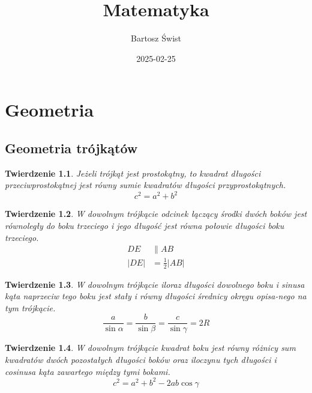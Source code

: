 \documentclass{report}
\title{Matematyka}
\date{2025-02-25}
\author{Bartosz Świst}
\newtheorem{theorem}{Twierdzenie}
\begin{document}
  \maketitle

  \chapter{Geometria}
    \section{Geometria trójkątów}
      \begin{theorem}
        Jeżeli trójkąt jest prostokątny, to kwadrat długości przeciwprostokątnej jest równy sumie kwadratów długości przyprostokątnych.
        \begin{equation}
          c^2 = a^2 + b^2
        \end{equation}
      \end{theorem}
      \begin{theorem}
        W dowolnym trójkącie odcinek łączący środki dwóch boków jest równoległy do boku trzeciego i jego długość jest równa połowie długości boku trzeciego.
        \begin{equation}
          \begin{aligned}
            DE &\parallel AB\\
            |DE| &= \frac 12|AB|
          \end{aligned}
        \end{equation}
      \end{theorem}
      \begin{theorem}
        W dowolnym trójkącie iloraz długości dowolnego boku i sinusa kąta naprzeciw tego boku jest stały i równy długości średnicy okręgu opisa-\-nego na tym trójkącie.
        \begin{equation}
          \frac{a}{\sin\alpha} = \frac{b}{\sin\beta} = \frac{c}{\sin\gamma} = 2R
        \end{equation}
      \end{theorem}
      \begin{theorem}
        W dowolnym trójkącie kwadrat boku jest równy różnicy sum kwadratów dwóch pozostałych długości boków oraz iloczynu tych długości i cosinusa kąta zawartego między tymi bokami.
        \begin{equation}
          c^2 = a^2 + b^2 - 2ab\cos\gamma
        \end{equation}
      \end{theorem}
\end{document}
